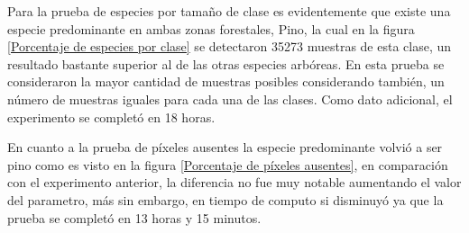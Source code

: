 Para la prueba de especies por tamaño de clase es evidentemente que existe una especie predominante en ambas zonas forestales, Pino, la cual en la figura \ref{Porcentaje de especies por clase} se detectaron 35273 muestras de esta clase, un resultado bastante superior al de las otras especies arbóreas. En esta prueba se consideraron la mayor cantidad de muestras posibles considerando también, un número de muestras iguales para cada una de las clases. Como dato adicional, el experimento se completó en 18 horas.

En cuanto a la prueba de píxeles ausentes la especie predominante volvió a ser pino como es visto en la figura \ref{Porcentaje de píxeles ausentes}, en comparación con el experimento anterior, la diferencia no fue muy notable aumentando el valor del parametro, más sin embargo, en tiempo de computo si disminuyó ya que la prueba se completó en 13 horas y 15 minutos.

%
%
